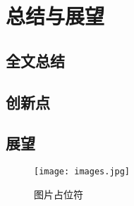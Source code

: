 \chapter{总结与展望}
\section{全文总结}
\section{创新点}
\section{展望}


\begin{figure}[htbp]
    \centering
    \texttt{[image: images.jpg]}
    \caption{\label{fig:fig-placeholder}图片占位符}
\end{figure}